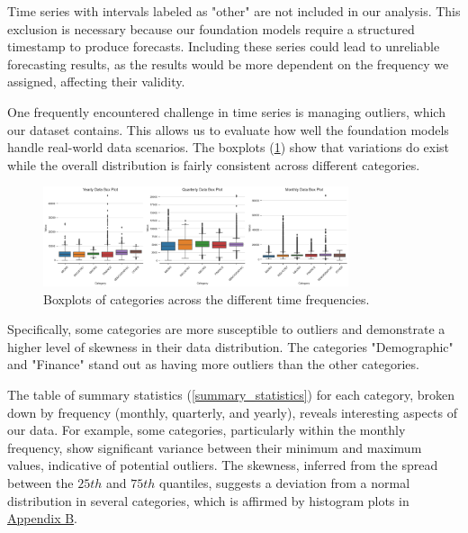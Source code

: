 \documentclass[12pt,a4paper]{article}
\begin{document}
Time series with intervals labeled as "other" are not included in our analysis. This exclusion is necessary because our foundation models require a structured timestamp to produce forecasts. Including these series could lead to unreliable forecasting results, as the results would be more dependent on the frequency we assigned, affecting their validity. 

One frequently encountered challenge in time series is managing outliers, which our dataset contains. This allows us to evaluate how well the foundation models handle real-world data scenarios. The boxplots (\ref{boxplot_data_distribution}) show that variations do exist while the overall distribution is fairly consistent across different categories. 

\begin{figure}[htbp]
  \centering
  \includegraphics[width=0.8\textwidth]{real_boxplot_data_descr.png}
  \caption{Boxplots of categories across the different time frequencies.}
  \label{boxplot_data_distribution}
\end{figure}

Specifically, some categories are more susceptible to outliers and demonstrate a higher level of skewness in their data distribution. The categories "Demographic" and "Finance" stand out as having more outliers than the other categories.

The table of summary statistics (\ref{summary_statistics}) for each category, broken down by frequency (monthly, quarterly, and yearly), reveals interesting aspects of our data. For example, some categories, particularly within the monthly frequency, show significant variance between their minimum and maximum values, indicative of potential outliers. The skewness, inferred from the spread between the $25th$ and $75th$ quantiles, suggests a deviation from a normal distribution in several categories, which is affirmed by histogram plots in \hyperref[appendix_b]{Appendix B}. 
\end{document}
